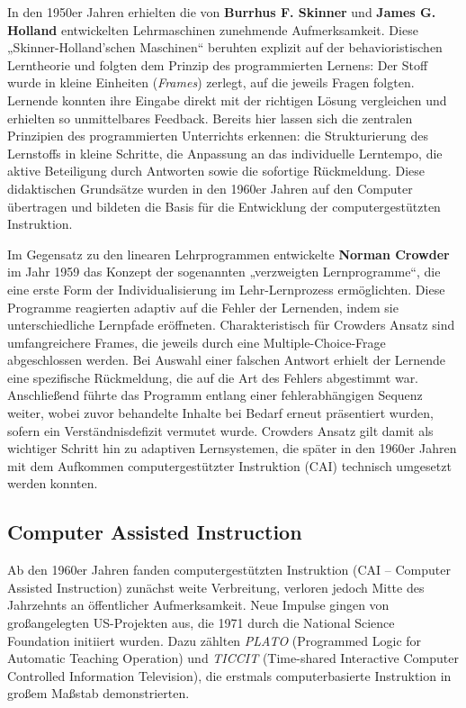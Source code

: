 In den 1950er Jahren erhielten die von \textbf{Burrhus F. Skinner} und \textbf{James G. Holland} entwickelten Lehrmaschinen zunehmende Aufmerksamkeit. Diese „Skinner-Holland’schen Maschinen“ beruhten explizit auf der behavioristischen Lerntheorie und folgten dem Prinzip des programmierten Lernens: Der Stoff wurde in kleine Einheiten (\textit{Frames}) zerlegt, auf die jeweils Fragen folgten. Lernende konnten ihre Eingabe direkt mit der richtigen Lösung vergleichen und erhielten so unmittelbares Feedback.\parencite[S.~970--977]{skinner_teaching_1958} Bereits hier lassen sich die zentralen Prinzipien des programmierten Unterrichts erkennen: die Strukturierung des Lernstoffs in kleine Schritte, die Anpassung an das individuelle Lerntempo, die aktive Beteiligung durch Antworten sowie die sofortige Rückmeldung.\parencite[S.~1971]{bruillard_teaching_2020} Diese didaktischen Grundsätze wurden in den 1960er Jahren auf den Computer übertragen und bildeten die Basis für die Entwicklung der computergestützten Instruktion.

Im Gegensatz zu den linearen Lehrprogrammen entwickelte \textbf{Norman Crowder} im Jahr 1959 das Konzept der sogenannten „verzweigten Lernprogramme“, die eine erste Form der Individualisierung im Lehr-Lernprozess ermöglichten. Diese Programme reagierten adaptiv auf die Fehler der Lernenden, indem sie unterschiedliche Lernpfade eröffneten. Charakteristisch für Crowders Ansatz sind umfangreichere Frames, die jeweils durch eine Multiple-Choice-Frage abgeschlossen werden. Bei Auswahl einer falschen Antwort erhielt der Lernende eine spezifische Rückmeldung, die auf die Art des Fehlers abgestimmt war. Anschließend führte das Programm entlang einer fehlerabhängigen Sequenz weiter, wobei zuvor behandelte Inhalte bei Bedarf erneut präsentiert wurden, sofern ein Verständnisdefizit vermutet wurde.\parencite[S.~252--254]{crowder_differences_1963}\parencite[S.~9]{schonfeld_computerbasiertes_2006} Crowders Ansatz gilt damit als wichtiger Schritt hin zu adaptiven Lernsystemen, die später in den 1960er Jahren mit dem Aufkommen computergestützter Instruktion (CAI) technisch umgesetzt werden konnten.

\subsection{Computer Assisted Instruction}

 Ab den 1960er Jahren fanden computergestützten Instruktion (CAI – Computer Assisted Instruction) zunächst weite Verbreitung, verloren jedoch Mitte des Jahrzehnts an öffentlicher Aufmerksamkeit. Neue Impulse gingen von großangelegten US-Projekten aus, die 1971 durch die National Science Foundation initiiert wurden. Dazu zählten \textit{PLATO} (Programmed Logic for Automatic Teaching Operation) und \textit{TICCIT} (Time-shared Interactive Computer Controlled Information Television), die erstmals computerbasierte Instruktion in großem Maßstab demonstrierten.\parencite[S.~7]{niegemann_kompendium_2008}\parencite[S.~69ff]{oshea_lernen_1986}

